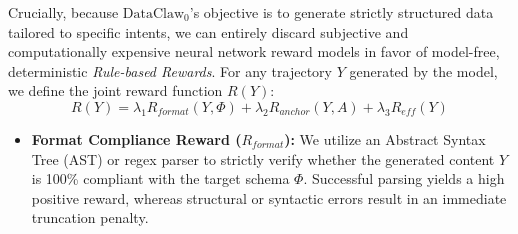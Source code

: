 \documentclass{llmxive}
\begin{document}
Crucially, because $\text{DataClaw}_0$'s objective is to generate strictly structured data tailored to specific intents, we can entirely discard subjective and computationally expensive neural network reward models in favor of model-free, deterministic \textit{Rule-based Rewards}. For any trajectory \(Y\) generated by the model, we define the joint reward function \(R(Y)\):
\begin{equation}
R(Y) = \lambda_1 R_{format}(Y, \Phi) + \lambda_2 R_{anchor}(Y, A) + \lambda_3 R_{eff}(Y)
\end{equation}

\begin{itemize}[leftmargin=20pt, labelsep=4pt]
    \item \textbf{Format Compliance Reward (\(R_{format}\)):} We utilize an Abstract Syntax Tree (AST) or regex parser to strictly verify whether the generated content \(Y\) is 100\% compliant with the target schema \(\Phi\). Successful parsing yields a high positive reward, whereas structural or syntactic errors result in an immediate truncation penalty.
    


\end{itemize}
\end{document}
